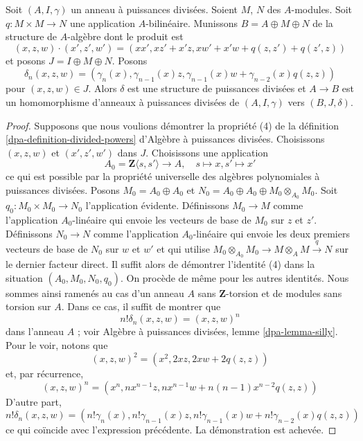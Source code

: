 \begin{lemma}
\label{lemma-divided-power-second-order-thickening}
Soit $(A, I, \gamma)$ un anneau à puissances divisées. Soient $M$, $N$ des $A$-modules.
Soit $q : M \times M \to N$ une application $A$-bilinéaire.
Munissons $B = A \oplus M \oplus N$ de la structure de $A$-algèbre dont le produit est
$$
(x, z, w)\cdot (x', z', w') = (xx', xz' + x'z, xw' + x'w + q(z, z') + q(z', z))
$$
et posons $J = I \oplus M \oplus N$. Posons
$$
\delta_n(x, z, w) = (\gamma_n(x), \gamma_{n - 1}(x)z,
\gamma_{n - 1}(x)w + \gamma_{n - 2}(x)q(z, z))
$$
pour $(x, z, w) \in J$.
Alors $\delta$ est une structure de puissances divisées et
$A \to B$ est un homomorphisme d'anneaux à puissances divisées de
$(A, I, \gamma)$ vers $(B, J, \delta)$.
\end{lemma}

\begin{proof}
Supposons que nous voulions démontrer la propriété (4) de la
définition \ref{dpa-definition-divided-powers} d'Algèbre à puissances divisées.
Choisissons $(x, z, w)$ et $(x', z', w')$ dans $J$.
Choisissons une application
$$
A_0 = \mathbf{Z}\langle s, s'\rangle \longrightarrow A,\quad
s \longmapsto x,
s' \longmapsto x'
$$
ce qui est possible par la propriété universelle des algèbres
polynomiales à puissances divisées. Posons $M_0 = A_0 \oplus A_0$ et
$N_0 = A_0 \oplus A_0 \oplus M_0 \otimes_{A_0} M_0$.
Soit $q_0 : M_0 \times M_0 \to N_0$ l'application évidente.
Définissons $M_0 \to M$ comme l'application $A_0$-linéaire qui envoie
les vecteurs de base de $M_0$ sur $z$ et $z'$. Définissons $N_0 \to N$
comme l'application $A_0$-linéaire qui envoie les deux premiers vecteurs de base
de $N_0$ sur $w$ et $w'$ et qui utilise
$M_0 \otimes_{A_0} M_0 \to M \otimes_A M \xrightarrow{q} N$
sur le dernier facteur direct. Il suffit alors de démontrer
l'identité (4) dans la situation $(A_0, M_0, N_0, q_0)$.
On procède de même pour les autres identités. Nous sommes ainsi ramenés au cas
d'un anneau $A$ sans $\mathbf{Z}$-torsion et de modules sans torsion sur $A$.
Dans ce cas, il suffit de montrer que
$$
n! \delta_n(x, z, w) = (x, z, w)^n
$$
dans l'anneau $A$ ; voir Algèbre à puissances divisées,
lemme \ref{dpa-lemma-silly}. Pour le voir, notons que
$$
(x, z, w)^2 = (x^2, 2xz, 2xw + 2q(z, z))
$$
et, par récurrence,
$$
(x, z, w)^n = (x^n, nx^{n - 1}z, nx^{n - 1}w + n(n - 1)x^{n - 2}q(z, z))
$$
D'autre part,
$$
n! \delta_n(x, z, w) = (n!\gamma_n(x), n!\gamma_{n - 1}(x)z,
n!\gamma_{n - 1}(x)w + n!\gamma_{n - 2}(x) q(z, z))
$$
ce qui coïncide avec l'expression précédente. La démonstration est achevée.
\end{proof}




